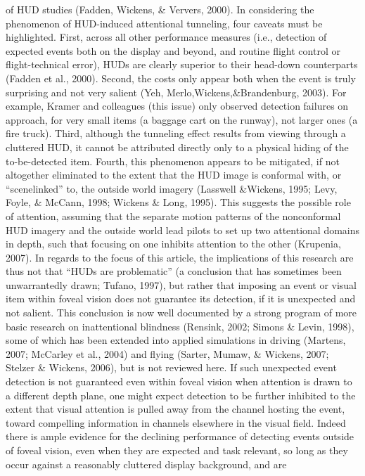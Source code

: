 \documentclass[utf8,bachelor,manualbib]{gradu3}
\begin{document}
of HUD studies (Fadden, Wickens, \& Ververs, 2000).
In considering the phenomenon of HUD-induced attentional tunneling, four caveats
must be highlighted. First, across all other performance measures (i.e., detection
of expected events both on the display and beyond, and routine flight control
or flight-technical error), HUDs are clearly superior to their head-down counterparts
(Fadden et al., 2000). Second, the costs only appear both when the event is
truly surprising and not very salient (Yeh, Merlo,Wickens,\&Brandenburg, 2003).
For example, Kramer and colleagues (this issue) only observed detection failures
on approach, for very small items (a baggage cart on the runway), not larger ones (a
fire truck). Third, although the tunneling effect results from viewing through a
cluttered HUD, it cannot be attributed directly only to a physical hiding of the
to-be-detected item. Fourth, this phenomenon appears to be mitigated, if not altogether
eliminated to the extent that the HUD image is conformal with, or “scenelinked”
to, the outside world imagery (Lasswell \&Wickens, 1995; Levy, Foyle, \&
McCann, 1998; Wickens \& Long, 1995). This suggests the possible role of attention,
assuming that the separate motion patterns of the nonconformal HUD imagery
and the outside world lead pilots to set up two attentional domains in depth,
such that focusing on one inhibits attention to the other (Krupenia, 2007).
In regards to the focus of this article, the implications of this research are thus
not that “HUDs are problematic” (a conclusion that has sometimes been unwarrantedly
drawn; Tufano, 1997), but rather that imposing an event or visual item
within foveal vision does not guarantee its detection, if it is unexpected and not salient.
This conclusion is now well documented by a strong program of more basic
research on inattentional blindness (Rensink, 2002; Simons \& Levin, 1998), some
of which has been extended into applied simulations in driving (Martens, 2007;
McCarley et al., 2004) and flying (Sarter, Mumaw, \& Wickens, 2007; Stelzer \&
Wickens, 2006), but is not reviewed here.
If such unexpected event detection is not guaranteed even within foveal vision
when attention is drawn to a different depth plane, one might expect detection to be further inhibited to the extent that visual attention is pulled away from the channel
hosting the event, toward compelling information in channels elsewhere in the visual
field. Indeed there is ample evidence for the declining performance of detecting
events outside of foveal vision, even when they are expected and task relevant,
so long as they occur against a reasonably cluttered display background, and are
\end{document}
